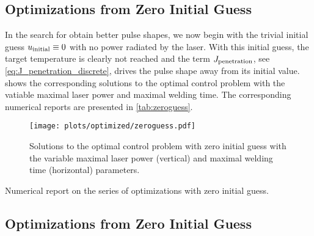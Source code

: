 \subsection{Optimizations from Zero Initial Guess}

In the search for obtain better pulse shapes, we now begin with the trivial initial guess $u_\textup{initial} \equiv 0$ with no power radiated by the laser. 
With this initial guess, the target temperature is clearly not reached and the term $J_\textup{penetration}$, see \eqref{eq:J_penetration_discrete}, drives the pulse shape away from its initial value.
 shows the corresponding solutions to the optimal control problem with the vatiable maximal laser power and maximal welding time. 
The corresponding numerical reports are presented in \cref{tab:zeroguess}.

\begin{figure} 
	\centering
	\texttt{[image: plots/optimized/zeroguess.pdf]}
	\caption{Solutions to the optimal control problem with zero initial guess with the variable maximal laser power (vertical) and maximal welding time (horizontal) parameters.}
	\label{fig:zeroguess}
\end{figure}

\begin{table} 
	\centering
	
	\caption{Numerical report on the series of optimizations with zero initial guess.}
	\label{tab:zeroguess}
\end{table}


\subsection{Optimizations from Zero Initial Guess}


